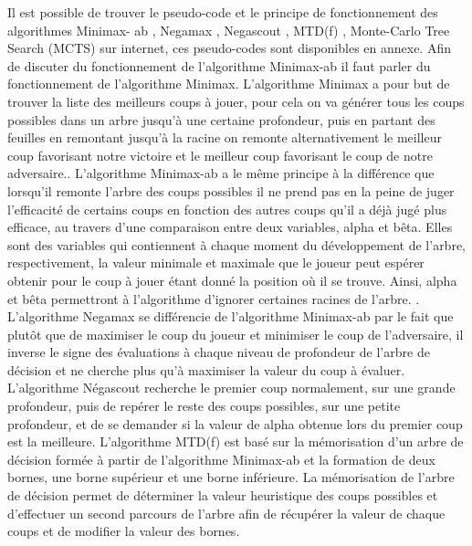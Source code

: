 \documentclass{article}
\begin{document}
Il est possible de trouver le pseudo-code et le principe de fonctionnement des algorithmes Minimax-
ab \cite{Minmax-ab}, Negamax \cite{Negamax}, Negascout \cite{Negascout}, MTD(f) \cite{MTD(f)}, Monte-Carlo Tree Search (MCTS)\cite{MCTS} sur internet, ces pseudo-codes sont disponibles en annexe.
\newline
Afin de discuter du fonctionnement de l'algorithme Minimax-ab il faut parler du fonctionnement de l'algorithme Minimax.
\newline
L'algorithme Minimax a pour but de trouver la liste des meilleurs coups à jouer, pour cela on va générer tous les coups possibles dans un arbre jusqu'à une certaine profondeur,  puis en partant des feuilles en remontant jusqu'à la racine on remonte alternativement le meilleur coup favorisant notre victoire et le meilleur coup favorisant le coup de notre adversaire.\cite{Heuristiques}.
\newline\newline
L'algorithme Minimax-ab a le même principe à la différence que lorsqu'il remonte l'arbre des coups possibles il ne prend pas en la peine de juger l'efficacité de certains coups en fonction des autres coups qu'il a déjà jugé plus efficace, au travers d'une comparaison entre deux variables, alpha et bêta. Elles sont des variables qui contiennent à chaque moment du développement de l'arbre, respectivement, la valeur minimale et maximale que le joueur peut espérer obtenir pour le coup à jouer étant donné la position où il se trouve. Ainsi, alpha et bêta permettront à l'algorithme d'ignorer certaines racines de l'arbre. \cite{Heuristiques}.
\newline\newline
L'algorithme Negamax se différencie de l'algorithme Minimax-ab par le fait que plutôt que de maximiser le coup du joueur et minimiser le coup de l'adversaire, il inverse le signe des évaluations à chaque niveau de profondeur de l'arbre de décision et ne cherche plus qu'à maximiser la valeur du coup à évaluer\cite{Negamax}.
\newline\newline
L'algorithme Négascout recherche le premier coup normalement, sur une grande profondeur, puis de repérer le reste des coups possibles, sur une petite profondeur, et de se demander si la valeur de alpha obtenue lors du premier coup est la meilleure\cite{Negascout}.
\newline\newline
L'algorithme MTD(f) est basé sur la mémorisation d'un arbre de décision formée à partir de l'algorithme Minimax-ab et la formation de deux bornes, une borne supérieur et une borne inférieure. La mémorisation de l'arbre de décision permet de déterminer la valeur heuristique des coups possibles et d'effectuer un second parcours de l'arbre afin de récupérer la valeur de chaque coups et de modifier la valeur des bornes.
\end{document}
